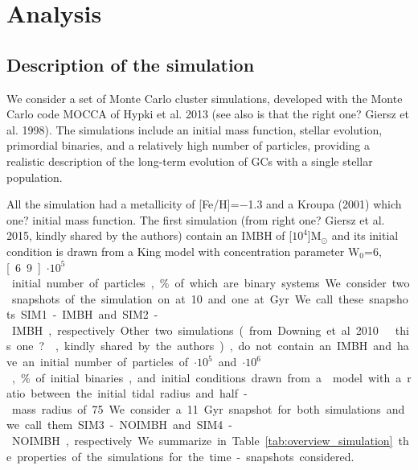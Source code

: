 \section{Analysis}

\subsection{Description of the simulation}
We consider a set of Monte Carlo cluster simulations, developed with the Monte Carlo
code MOCCA of \citet{2013MNRAS.429.1221H}Hypki et al. 2013 (see also \citet{1998MNRAS.298.1239G} \color{red} is that the right one? \color{black} Giersz et al. 1998). The simulations
include an initial mass function, stellar evolution, primordial binaries, and a
relatively high number of particles, providing a realistic description of the
long-term evolution of \acp{GC} with a single stellar population.

All the simulation had a metallicity of [Fe/H]=$-$1.3 and a Kroupa (2001) \color{red} which one? \color{black} initial
mass function. The first simulation (from \citet{2015MNRAS.454.3150G} \color{red} right one? \color{black} Giersz et al. 2015, kindly shared by the
authors) contain an \ac{IMBH} of \unit[$10^4$]{M$_\odot$} and its initial condition is drawn from a
King model with concentration parameter W$_0 $=6, \unit[6.9]{$\cdot10^5$} initial number of particles,
\unit[95]{\%} of which are binary systems. We consider two snapshots of the simulation on at
10 and one at \unit[7]{Gyr}. We call these snapshots SIM1-IMBH and SIM2-IMBH, respectively.
Other two simulations (from Downing et al. 2010\citet{2010MNRAS.407.1946D}\color{red} this one? \color{black}, kindly shared by the authors), do
not contain an \ac{IMBH} and have an initial number of particles of \unit[5]{$\cdot10^5$} and \unit[2]{$\cdot10^6$}, \unit[10]{\%}
of initial binaries, and initial conditions drawn from a \citet{1911MNRAS..71..460P} model with a
ratio between the initial tidal radius and half-mass radius of 75. We consider a 11
Gyr snapshot for both simulations and we call them SIM3-NOIMBH and SIM4-NOIMBH,
respectively.

We summarize in Table \ref{tab:overview_simulation} the properties of the simulations for the time-snapshots
considered. 


